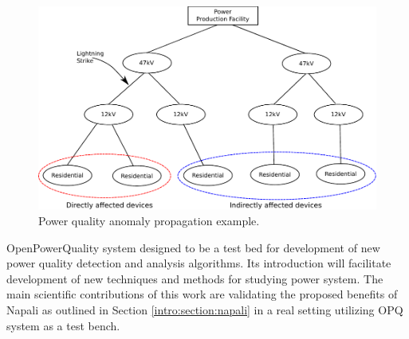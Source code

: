 \begin{figure}[h]
	\centering
	  \includegraphics[width=0.9\linewidth]{img/grid_hierarchy_cartoon.pdf}
	  \caption{Power quality anomaly propagation example.}
	  \label{intro:fig2}

\end{figure}

OpenPowerQuality system designed to be a test bed for development of new power quality detection and analysis algorithms. Its introduction will facilitate development of new techniques and methods for studying power system. The main scientific contributions of this work are validating the proposed benefits of Napali as outlined in Section \ref{intro:section:napali} in a real setting utilizing OPQ system as a test bench.
